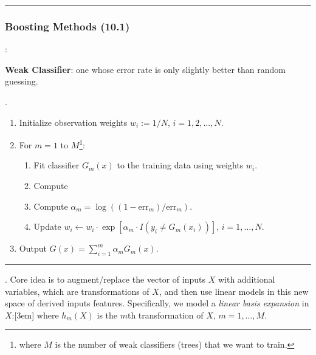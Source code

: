 \documentclass[11pt]{article}
\begin{document}

\myspace
\hrule
\subsubsection{Boosting Methods (10.1)}

\p {}:
\begin{compactitem}
	\item \textbf{Weak Classifier}: one whose error rate is only slightly better than random guessing.
\end{compactitem}

\p {}. 

\begin{enumerate}
	\item Initialize observation weights $w_i := 1/N$, $i = 1, 2, \ldots, N$. 
	
	\item For $m = 1$ to $M$\footnote{where $M$ is the number of weak classifiers (trees) that we want to train.}:
	\begin{enumerate}
		\item Fit classifier $G_m(x)$ to the training data using weights $w_i$. 
		\item Compute
		\item Compute $\alpha_m = \log\left( (1 - \text{err}_m)/\text{err}_m \right)$.
		\item Update $w_i \leftarrow w_i \cdot \exp[ \alpha_m \cdot I(y_i \ne G_m(x_i)) ]$, $i = 1, \ldots, N$.
	\end{enumerate}
	
	\item Output $G(x) = \sum_{i = 1}^{m} \alpha_m G_m(x)$. 
\end{enumerate}
\hrule



\p {}. Core idea is to augment/replace the vector of inputs $X$ with additional variables, which are transformations of $X$, and then use linear models in this new space of derived inputs features. Specifically, we model a \textit{linear basis expansion} in $X$:[3em]
where $h_m(X)$ is the $m$th transformation of $X$, $m = 1,\ldots,M$. 
\end{document}
